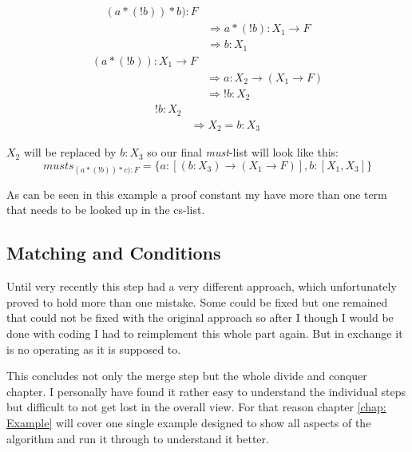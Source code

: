 \begin{equation}\label{musts}
\begin{split}
	(a*(!b))*b):F \\
	& \Rightarrow a*(!b):  X_1 \rightarrow F \\
	& \Rightarrow b:  X_1
\end{split}
\end{equation}
\begin{equation}\label{musts1}
\begin{split}
	(a*(!b)): X_1 \rightarrow F \\
	& \Rightarrow a: X_2 \rightarrow (X_1 \rightarrow F)\\
	& \Rightarrow !b: X_2
\end{split}
\end{equation}
\begin{equation}\label{musts2}
\begin{split}
	!b: X_2 \\
	& \Rightarrow X_2 = b:X_3
\end{split}
\end{equation}

$X_2$ will be replaced by $b:X_3$ so our final \emph{must}-list will look like this: 
\begin{equation}\label{must-list}
musts_{(a*(!b))*c):F} = \{a: [(b:X_3) \rightarrow (X_1 \rightarrow F)], b: [X_1, X_3] \}
\end{equation}

As can be seen in this example a proof constant my have more than one term that needs to be looked up in the cs-list.

\subsection{Matching and Conditions}
Until very recently this step had a very different approach, which unfortunately proved to hold more than one mistake. Some could be fixed but one remained that could not be fixed with the original approach so after I though I would be done with coding I had to reimplement this whole part again. But in exchange it is no operating as it is supposed to.




\par This concludes not only the merge step but the whole divide and conquer chapter. I personally have found it rather easy to understand the individual steps but difficult to not get lost in the overall view. For that reason chapter \ref{chap: Example} will cover one single example designed to show all aspects of the algorithm and run it through to understand it better.